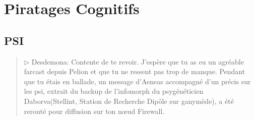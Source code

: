 \chapter{Piratages Cognitifs} \label{cha:mind-hacks} 

\section{PSI} 

\begin{quotation} 

$\triangleright $ Desdemona: Contente de te revoir. J'espère que tu as eu un agréable farcast depuis Pelion et que tu ne ressent pas trop de manque. Pendant que tu étais en ballade, un message d'Aeneas accompagné d'un précis sur les psi, extrait du backup de l'infomorph du psygénéticien Daborva(Stellint, Station de Recherche Dipôle sur ganymède), a été rerouté pour diffusion sur ton nœud Firewall. \end{quotation} 

